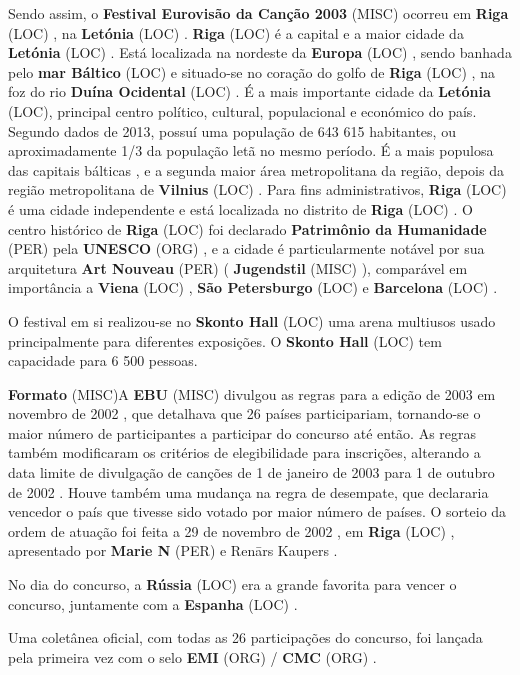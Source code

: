 \documentclass[12pt,a4paper]{article}
\begin{document}
Sendo assim, o \textbf{Festival Eurovisão da Canção 2003} (MISC) ocorreu em \textbf{Riga} (LOC) , na \textbf{Letónia} (LOC) . \textbf{Riga} (LOC) é a capital e a maior cidade da \textbf{Letónia} (LOC) . Está localizada na nordeste da \textbf{Europa} (LOC) , sendo banhada pelo \textbf{mar Báltico} (LOC) e situado-se no coração do golfo de \textbf{Riga} (LOC) , na foz do rio \textbf{Duína Ocidental} (LOC) . É a mais importante cidade da \textbf{Letónia} (LOC), principal centro político, cultural, populacional e económico do país. Segundo dados de 2013, possuí uma população de 643 615 habitantes, ou aproximadamente 1/3 da população letã no mesmo período. É a mais populosa das capitais bálticas , e a segunda maior área metropolitana da região, depois da região metropolitana de \textbf{Vilnius} (LOC) . Para fins administrativos, \textbf{Riga} (LOC) é uma cidade independente e está localizada no distrito de \textbf{Riga} (LOC) . O centro histórico de \textbf{Riga} (LOC) foi declarado \textbf{Patrimônio da Humanidade} (PER) pela \textbf{UNESCO} (ORG) , e a cidade é particularmente notável por sua arquitetura \textbf{Art Nouveau} (PER) ( \textbf{Jugendstil} (MISC) ), comparável em importância a \textbf{Viena} (LOC) , \textbf{São Petersburgo} (LOC) e \textbf{Barcelona} (LOC) .

O festival em si realizou-se no \textbf{Skonto Hall} (LOC) uma arena multiusos usado principalmente para diferentes exposições. O \textbf{Skonto Hall} (LOC) tem capacidade para 6 500 pessoas.



\textbf{Formato} (MISC)A \textbf{EBU} (MISC) divulgou as regras para a edição de 2003 em novembro de 2002 , que detalhava que 26 países participariam, tornando-se o maior número de participantes a participar do concurso até então. As regras também modificaram os critérios de elegibilidade para inscrições, alterando a data limite de divulgação de canções de 1 de janeiro de 2003 para 1 de outubro de 2002 . Houve também uma mudança na regra de desempate, que declararia vencedor o país que tivesse sido votado por maior número de países. O sorteio da ordem de atuação foi feita a 29 de novembro de 2002 , em \textbf{Riga} (LOC) , apresentado por \textbf{Marie N} (PER) e Renārs Kaupers .

No dia do concurso, a \textbf{Rússia} (LOC) era a grande favorita para vencer o concurso, juntamente com a \textbf{Espanha} (LOC) .

Uma coletânea oficial, com todas as 26 participações do concurso, foi lançada pela primeira vez com o selo \textbf{EMI} (ORG) / \textbf{CMC} (ORG) .
\end{document}
